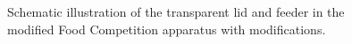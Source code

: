 \documentclass[english, a4paper, 11pt]{article}
\begin{document}
\begin{figure}[h]
    \centering
    \caption{Schematic illustration of the transparent lid and feeder in the modified Food Competition apparatus with modifications.}
    \label{fig:modified_apparatus_feeder}
\end{figure}
\end{document}
